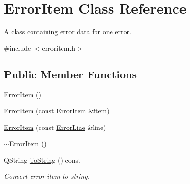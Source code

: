 \hypertarget{class_error_item}{\section{Error\-Item Class Reference}
\label{class_error_item}
}


A class containing error data for one error.  




{\ttfamily \#include $<$erroritem.\-h$>$}

\subsection*{Public Member Functions}
\begin{DoxyCompactItemize}
\item 
\hyperlink{class_error_item_a8a9b03357b90010b769ce778e689824d}{Error\-Item} ()
\item 
\hyperlink{class_error_item_a9f09ec996614d73fe4bcb73c5fd4e4d5}{Error\-Item} (const \hyperlink{class_error_item}{Error\-Item} \&item)
\item 
\hyperlink{class_error_item_a34c6457b5511583a21e7a72584595023}{Error\-Item} (const \hyperlink{class_error_line}{Error\-Line} \&line)
\item 
\hyperlink{class_error_item_acc07ce32b1ead2bad7a600e6c277754d}{$\sim$\-Error\-Item} ()
\item 
Q\-String \hyperlink{class_error_item_a3c71112d7592bb0c6a414269c8fd7c97}{To\-String} () const 
\begin{DoxyCompactList}\small\item\em Convert error item to string. \end{DoxyCompactList}\end{DoxyCompactItemize}
